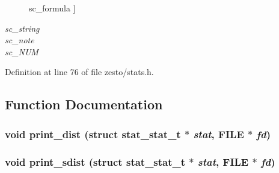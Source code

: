 \begin{Desc}
\begin{description}
{sc\_\-formula\label{zesto_2stats_8h_7caa50c971612efca8f45cbf1106e596c764056d87be9592100bdbc0c729fb5f}
}]\item[{\em 
sc\_\-string\label{zesto_2stats_8h_7caa50c971612efca8f45cbf1106e5963347ce5c90c6634f001634d8ab4b1e7a}
}]\item[{\em 
sc\_\-note\label{zesto_2stats_8h_7caa50c971612efca8f45cbf1106e596805b2b994341a4b8f3a86f07b7388ea1}
}]\item[{\em 
sc\_\-NUM\label{zesto_2stats_8h_7caa50c971612efca8f45cbf1106e5968b6568f9e4b06cb9657df8a48956de73}
}]\end{description}
\end{Desc}



Definition at line 76 of file zesto/stats.h.

\subsection{Function Documentation}
\subsubsection[{print\_\-dist}]{\setlength{\rightskip}{0pt plus 5cm}void print\_\-dist (struct {\bf stat\_\-stat\_\-t} $\ast$ {\em stat}, \/  FILE $\ast$ {\em fd})}\label{zesto_2stats_8h_162e72b041405e38ba5550fe16b345c9}


\subsubsection[{print\_\-sdist}]{\setlength{\rightskip}{0pt plus 5cm}void print\_\-sdist (struct {\bf stat\_\-stat\_\-t} $\ast$ {\em stat}, \/  FILE $\ast$ {\em fd})}\label{zesto_2stats_8h_d6343ab164d17218e4312f17318bec2b}


